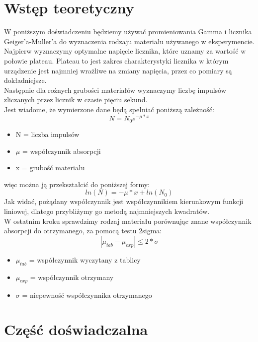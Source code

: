 \documentclass{article}
\begin{document}
\section{Wstęp teoretyczny}
W poniższym doświadczeniu będziemy używać promieniowania Gamma i licznika Geiger'a-Muller'a do wyznaczenia rodzaju materiału używanego w eksperymencie.\\
Najpierw wyznaczymy optymalne napięcie licznika, które uznamy za wartość w połowie plateau. Plateau to jest zakres charakterystyki licznika w którym urządzenie jest najmniej wrażliwe na zmiany napięcia, przez co pomiary są dokładniejsze. \\
Następnie dla rożnych grubości materiałów wyznaczymy liczbę impulsów zliczanych przez licznik w czasie pięciu sekund. \\
Jest wiadome, że wymierzone dane będą spełniać poniższą zależność:
\begin{equation}
    N = N_{0}e^{-\mu * x}
\end{equation}
\begin{itemize}
    \item N = liczba impulsów
    \item $\mu$ = współczynnik absorpcji
    \item x = grubość materiału
\end{itemize}
więc można ją przekształcić do poniższej formy:
\begin{equation}
    ln(N) = -\mu * x + ln(N_{0})
\end{equation}
Jak widać, pożądany współczynnik jest współczynnikiem kierunkowym funkcji liniowej, dlatego przybliżymy go metodą najmniejszych kwadratów.\\
W ostatnim kroku sprawdzimy rodzaj materiału porównując znane współczynnik absorpcji do otrzymanego, za pomocą testu 2sigma:
\begin{equation}
    |\mu_{tab} - \mu_{exp} | \leq 2 * \sigma
\end{equation}
\begin{itemize}
    \item $\mu_{tab}$ = współczynnik wyczytany z tablicy
    \item $\mu_{exp}$ = współczynnik otrzymany
    \item $\sigma$ = niepewność współczynnika otrzymanego
\end{itemize}

\clearpage
\section{Część doświadczalna}
\end{document}
